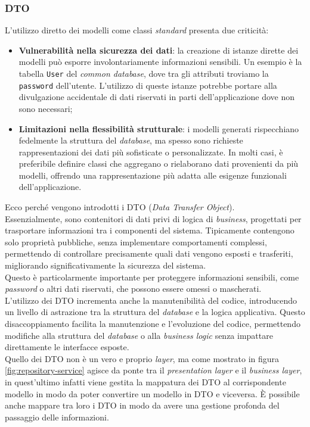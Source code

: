\subsubsection{DTO}\label{chap:dto}
L'utilizzo diretto dei modelli come classi \textit{standard} presenta due criticità:
\begin{itemize}
    \item \textbf{Vulnerabilità nella sicurezza dei dati}: la creazione di istanze dirette dei modelli può esporre 
          involontariamente informazioni sensibili. Un esempio è la tabella \texttt{User} del \textit{common database}, 
          dove tra gli attributi troviamo la \texttt{password} dell'utente. L'utilizzo di queste 
          istanze potrebbe portare alla divulgazione accidentale di dati riservati in parti dell'applicazione dove 
          non sono necessari;
    \item \textbf{Limitazioni nella flessibilità strutturale}: i modelli generati rispecchiano fedelmente la struttura 
        del \textit{database}, ma spesso sono richieste rappresentazioni dei dati più sofisticate o personalizzate. 
          In molti casi, è preferibile definire classi che aggregano o rielaborano dati provenienti da più modelli, 
          offrendo una rappresentazione più adatta alle esigenze funzionali dell'applicazione.
\end{itemize}
Ecco perché vengono introdotti i DTO (\textit{Data Transfer Object}).\\
Essenzialmente, sono contenitori di dati privi di logica di \textit{business}, progettati per trasportare informazioni tra i 
componenti del sistema. Tipicamente contengono solo proprietà pubbliche, senza implementare comportamenti complessi, 
permettendo di controllare precisamente quali dati vengono esposti e trasferiti, migliorando significativamente la 
sicurezza del sistema.\\
Questo è particolarmente importante per proteggere informazioni sensibili, come \textit{password} o altri dati riservati, 
che possono essere omessi o mascherati.\\
L'utilizzo dei DTO incrementa anche la manutenibilità del codice, introducendo un livello di astrazione tra la 
struttura del \textit{database} e la logica applicativa. Questo disaccoppiamento facilita la manutenzione e 
l'evoluzione del codice, permettendo modifiche alla struttura del \textit{database} o alla \textit{business logic} 
senza impattare direttamente le interfacce esposte.\\
Quello dei DTO non è un vero e proprio \textit{layer}, ma come mostrato in figura \ref{fig:repository-service} agisce 
da ponte tra il \textit{presentation layer} e il \textit{business layer}, in quest'ultimo infatti viene gestita la 
mappatura dei DTO al corrispondente modello in modo da poter convertire un modello in DTO e viceversa.
È possibile anche mappare tra loro i DTO in modo da avere una gestione profonda del passaggio delle informazioni.
